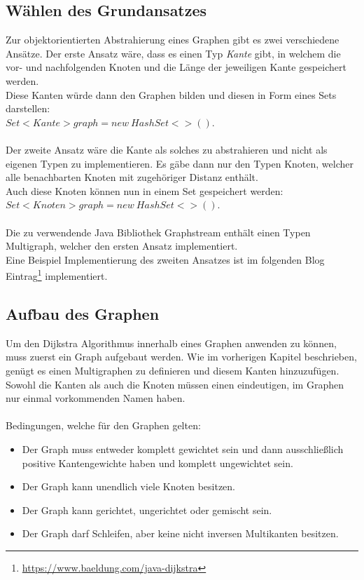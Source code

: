 \documentclass[a4paper]{article}
\begin{document}
\subsection{Wählen des Grundansatzes}

Zur objektorientierten Abstrahierung eines Graphen gibt es zwei verschiedene Ansätze. Der erste Ansatz wäre, dass es einen Typ \textit{Kante} gibt, in welchem die vor- und nachfolgenden Knoten und die Länge der jeweiligen Kante gespeichert werden.\\
Diese Kanten würde dann den Graphen bilden und diesen in Form eines Sets darstellen:\\$Set <Kante> graph = new\ HashSet<>()$.\\\\
Der zweite Ansatz wäre die Kante als solches zu abstrahieren und nicht als eigenen Typen zu implementieren. Es gäbe dann nur den Typen Knoten, welcher alle benachbarten Knoten mit zugehöriger Distanz enthält.\\
Auch diese Knoten können nun in einem Set gespeichert werden:\\
$Set<Knoten> graph = new\ HashSet<>()$.\\\\
Die zu verwendende Java Bibliothek Graphstream enthält einen Typen Multigraph, welcher den ersten Ansatz implementiert.\\
Eine Beispiel Implementierung des zweiten Ansatzes ist im folgenden Blog Eintrag\footnote{\url{https://www.baeldung.com/java-dijkstra}} implementiert.



\subsection{Aufbau des Graphen}

Um den Dijkstra Algorithmus innerhalb eines Graphen anwenden zu können, muss zuerst ein Graph aufgebaut werden.
Wie im vorherigen Kapitel beschrieben, genügt es einen Multigraphen zu definieren und diesem Kanten hinzuzufügen.
Sowohl die Kanten als auch die Knoten müssen einen eindeutigen, im Graphen nur einmal vorkommenden Namen haben.\\\\
Bedingungen, welche für den Graphen gelten:
\begin{itemize}
    \item Der Graph muss entweder komplett gewichtet sein und dann ausschließlich positive Kantengewichte haben und komplett ungewichtet sein.
    \item Der Graph kann unendlich viele Knoten besitzen.
    \item Der Graph kann gerichtet, ungerichtet oder gemischt sein.
    \item Der Graph darf Schleifen, aber keine nicht inversen Multikanten besitzen.
\end{itemize}
\end{document}
